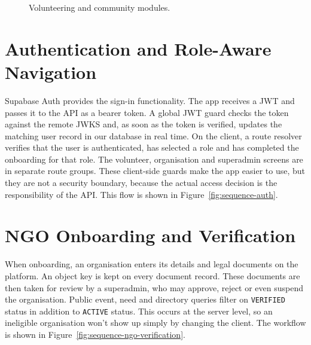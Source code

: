 \vspace{0.3in}
\begin{figure}[H]
    \centering
    \caption{Volunteering and community modules.}
    \label{fig:modules-b}
\end{figure}

\section{Authentication and Role-Aware Navigation}
\label{sec:impl-auth}
Supabase Auth provides the sign-in functionality. The app receives a JWT and passes it to the API as a bearer token. A global JWT guard checks the token against the remote JWKS and, as soon as the token is verified, updates the matching user record in our database in real time. On the client, a route resolver verifies that the user is authenticated, has selected a role and has completed the onboarding for that role. The volunteer, organisation and superadmin screens are in separate route groups. These client-side guards make the app easier to use, but they are not a security boundary, because the actual access decision is the responsibility of the API. This flow is shown in Figure~\ref{fig:sequence-auth}.


\section{NGO Onboarding and Verification}
\label{sec:impl-verification}
When onboarding, an organisation enters its details and legal documents on the platform. An object key is kept on every document record. These documents are then taken for review by a superadmin, who may approve, reject or even suspend the organisation. Public event, need and directory queries filter on \texttt{VERIFIED} status in addition to \texttt{ACTIVE} status. This occurs at the server level, so an ineligible organisation won't show up simply by changing the client. The workflow is shown in Figure~\ref{fig:sequence-ngo-verification}.


